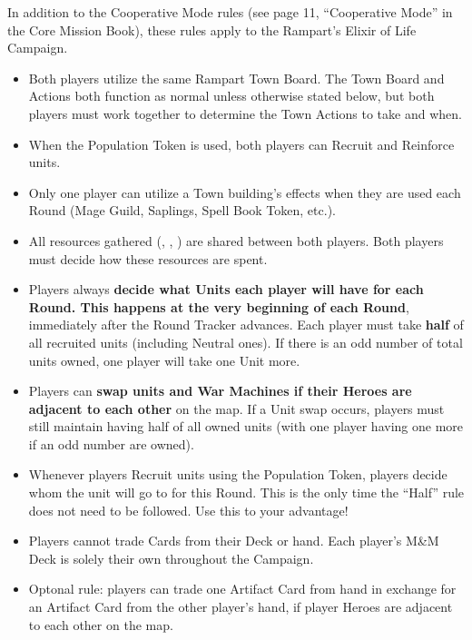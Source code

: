 
\begin{multicols*}{2}

In addition to the Cooperative Mode rules (see page 11, ``Cooperative Mode'' in the Core Mission Book), these rules apply to the Rampart's Elixir of Life Campaign.

\begin{itemize}
  \item Both players utilize the same Rampart Town Board.
    The Town Board and Actions both function as normal unless otherwise stated below, but both players must work together to determine the Town Actions to take and when.
  \item When the Population Token is used, both players can Recruit and Reinforce units.
  \item Only one player can utilize a Town building's effects when they are used each Round (Mage Guild, Saplings, Spell Book Token, etc.).
  \item All resources gathered (, , ) are shared between both players.
    Both players must decide how these resources are spent.
  \item Players always \textbf{decide what Units each player will have for each Round.
    This happens at the very beginning of each Round}, immediately after the Round Tracker advances.
    Each player must take \textbf{half} of all recruited units (including Neutral ones).
    If there is an odd number of total units owned, one player will take one Unit more.
  \item Players can \textbf{swap units and War Machines if their Heroes are adjacent to each other} on the map.
    If a Unit swap occurs, players must still maintain having half of all owned units (with one player having one more if an odd number are owned).
  \item Whenever players Recruit units using the Population Token, players decide whom the unit will go to for this Round.
    This is the only time the ``Half'' rule does not need to be followed.
    Use this to your advantage!
  \item Players cannot trade Cards from their Deck or hand.
    Each player's M\&M Deck is solely their own throughout the Campaign.
  \item Optonal rule: players can trade one Artifact Card from hand in exchange for an Artifact Card from the other player's hand, if player Heroes are adjacent to each other on the map.
\end{itemize}

\vspace*{\fill}
\begin{center}
\end{center}

\end{multicols*}
